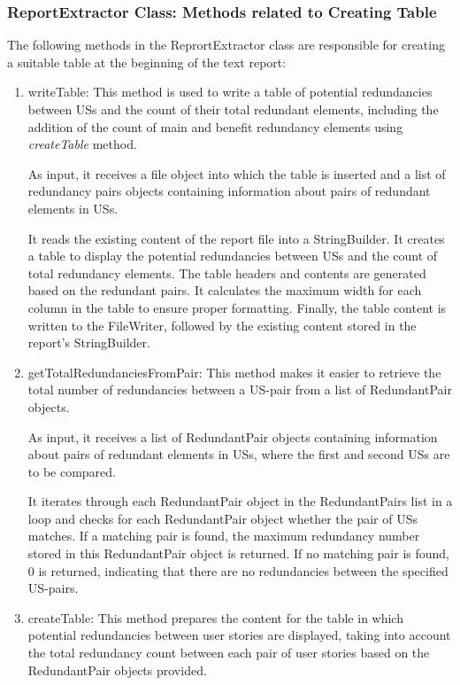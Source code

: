 \subsubsection*{ReportExtractor Class: Methods related to Creating Table}
The following methods in the ReprortExtractor class are responsible for creating a suitable table at the beginning of the text report:
\begin{enumerate}
	\item writeTable: This method is used to write a table of potential redundancies between USs and the count of their total redundant elements, including the addition of the count of main and benefit redundancy elements using \textit{createTable} method.
	
	As input, it receives a file object into which the table is inserted and a list of redundancy pairs objects containing information about pairs of redundant elements in USs.
	
	It reads the existing content of the report file into a StringBuilder. It creates a table to display the potential redundancies between USs and the count of total redundancy elements. The table headers and contents are generated based on the redundant pairs. It calculates the maximum width for each column in the table to ensure proper formatting. Finally, the table content is written to the FileWriter, followed by the existing content stored in the report's StringBuilder.
	
	\item getTotalRedundanciesFromPair: This method makes it easier to retrieve the total number of redundancies between a US-pair from a list of RedundantPair objects.
	
	As input, it receives a list of RedundantPair objects containing information about pairs of redundant elements in USs, where the first and second USs are to be compared.
	
	It iterates through each RedundantPair object in the RedundantPairs list in a loop and checks for each RedundantPair object whether the pair of USs matches. If a matching pair is found, the maximum redundancy number stored in this RedundantPair object is returned. If no matching pair is found, 0 is returned, indicating that there are no redundancies between the specified US-pairs.
	
	\item createTable: This method prepares the content for the table in which potential redundancies between user stories are displayed, taking into account the total redundancy count between each pair of user stories based on the RedundantPair objects provided.
	

\end{enumerate}
